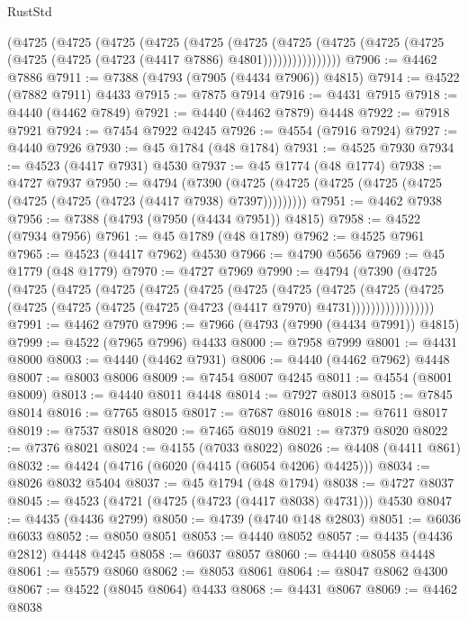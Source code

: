 \begin{lexlean}{RustStd}
\begin{coremodule}
{\begin{coremodule}
{{{{{{{{{{{{{{{{{{{{{{{{{{{{{{{{{{{{{{{{{{{{{{{{{{{{{{{{{{{{          (@4725
            (@4725
              (@4725
                (@4725
                  (@4725
                    (@4725
                      (@4725
                        (@4725
                          (@4725 (@4725 (@4725 (@4725 (@4723 (@4417 @7886) @4801))))))))))))))))
@7906 := @4462 @7886
@7911 := @7388 (@4793 (@7905 (@4434 @7906)) @4815)
@7914 := @4522 (@7882 @7911) @4433
@7915 := @7875 @7914
@7916 := @4431 @7915
@7918 := @4440 (@4462 @7849)
@7921 := @4440 (@4462 @7879) @4448
@7922 := @7918 @7921
@7924 := @7454 @7922 @4245
@7926 := @4554 (@7916 @7924)
@7927 := @4440 @7926
@7930 := @45 @1784 (@48 @1784)
@7931 := @4525 @7930
@7934 := @4523 (@4417 @7931) @4530
@7937 := @45 @1774 (@48 @1774)
@7938 := @4727 @7937
@7950 := @4794
    (@7390 (@4725 (@4725 (@4725 (@4725 (@4725 (@4725 (@4725 (@4723 (@4417 @7938) @7397)))))))))
@7951 := @4462 @7938
@7956 := @7388 (@4793 (@7950 (@4434 @7951)) @4815)
@7958 := @4522 (@7934 @7956)
@7961 := @45 @1789 (@48 @1789)
@7962 := @4525 @7961
@7965 := @4523 (@4417 @7962) @4530
@7966 := @4790 @5656
@7969 := @45 @1779 (@48 @1779)
@7970 := @4727 @7969
@7990 := @4794
    (@7390
      (@4725
        (@4725
          (@4725
            (@4725
              (@4725
                (@4725
                  (@4725
                    (@4725
                      (@4725
                        (@4725
                          (@4725
                            (@4725 (@4725 (@4725 (@4725 (@4723 (@4417 @7970) @4731)))))))))))))))))
@7991 := @4462 @7970
@7996 := @7966 (@4793 (@7990 (@4434 @7991)) @4815)
@7999 := @4522 (@7965 @7996) @4433
@8000 := @7958 @7999
@8001 := @4431 @8000
@8003 := @4440 (@4462 @7931)
@8006 := @4440 (@4462 @7962) @4448
@8007 := @8003 @8006
@8009 := @7454 @8007 @4245
@8011 := @4554 (@8001 @8009)
@8013 := @4440 @8011 @4448
@8014 := @7927 @8013
@8015 := @7845 @8014
@8016 := @7765 @8015
@8017 := @7687 @8016
@8018 := @7611 @8017
@8019 := @7537 @8018
@8020 := @7465 @8019
@8021 := @7379 @8020
@8022 := @7376 @8021
@8024 := @4155 (@7033 @8022)
@8026 := @4408 (@4411 @861)
@8032 := @4424 (@4716 (@6020 (@4415 (@6054 @4206) @4425)))
@8034 := @8026 @8032 @5404
@8037 := @45 @1794 (@48 @1794)
@8038 := @4727 @8037
@8045 := @4523 (@4721 (@4725 (@4723 (@4417 @8038) @4731))) @4530
@8047 := @4435 (@4436 @2799)
@8050 := @4739 (@4740 @148 @2803)
@8051 := @6036 @6033
@8052 := @8050 @8051
@8053 := @4440 @8052
@8057 := @4435 (@4436 @2812) @4448 @4245
@8058 := @6037 @8057
@8060 := @4440 @8058 @4448
@8061 := @5579 @8060
@8062 := @8053 @8061
@8064 := @8047 @8062 @4300
@8067 := @4522 (@8045 @8064) @4433
@8068 := @4431 @8067
@8069 := @4462 @8038
}}}}}}}}}}}}}}}}}}}}}}}}}}}}}}}}}}}}}}}}}}}}}}}}}}}}}}}}}}}}
\end{coremodule}}
\end{coremodule}
\end{lexlean}
